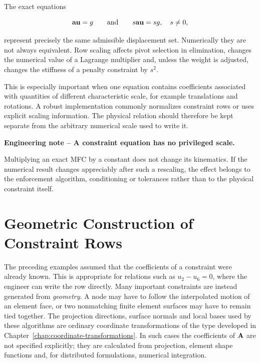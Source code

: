 The exact equations

\begin{equation}
    \mathbf{a}\mathbf{u}=g
    \qquad\text{and}\qquad
    s\mathbf{a}\mathbf{u}=sg,
    \quad s\neq0,
\end{equation}

represent precisely the same admissible displacement set. Numerically they are
not always equivalent. Row scaling affects pivot selection in elimination,
changes the numerical value of a Lagrange multiplier and, unless the weight is
adjusted, changes the stiffness of a penalty constraint by $s^2$.

This is especially important when one equation contains coefficients associated
with quantities of different characteristic scale, for example translations and
rotations. A robust implementation commonly normalizes constraint rows or uses
explicit scaling information. The physical relation should therefore be kept
separate from the arbitrary numerical scale used to write it.

\begin{bbox}
\textbf{Engineering note -- A constraint equation has no privileged scale.}

Multiplying an exact MFC by a constant does not change its kinematics. If the
numerical result changes appreciably after such a rescaling, the effect belongs
to the enforcement algorithm, conditioning or tolerances rather than to the
physical constraint itself.
\end{bbox}


\section{Geometric Construction of Constraint Rows}\label{sec:mfc-geometric-constraints}

The preceding examples assumed that the coefficients of a constraint were
already known. This is appropriate for relations such as $u_2-u_6=0$, where the
engineer can write the row directly. Many important constraints are instead
generated from \textit{geometry}. A node may have to follow the interpolated
motion of an element face, or two nonmatching finite element surfaces may have
to remain tied together. The projection directions, surface normals and local
bases used by these algorithms are ordinary coordinate transformations of the
type developed in Chapter~\ref{chap:coordinate-transformations}. In such cases
the coefficients of $\mathbf{A}$ are not specified explicitly; they are calculated
from projection, element shape functions and, for distributed formulations,
numerical integration.

